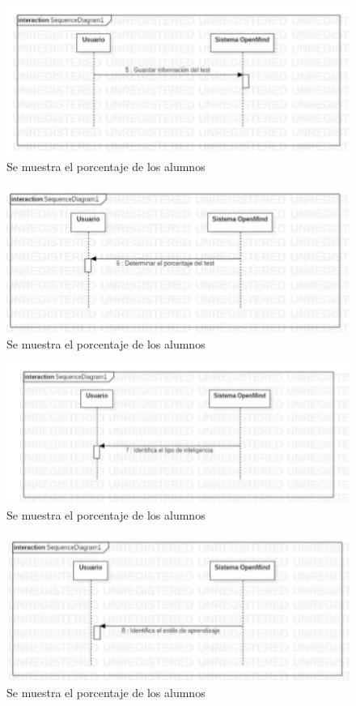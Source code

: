 \documentclass[letterpaper,oneside,openany,11pt]{book}
\begin{document}
\begin{figure}[H]
	\centering
	\includegraphics[width=1.0\textwidth]{./Imagenes/27}
	\caption{Se muestra el porcentaje de los alumnos}
\end{figure}

\begin{figure}[H]
	\centering
	\includegraphics[width=1.0\textwidth]{./Imagenes/28}
	\caption{Se muestra el porcentaje de los alumnos}
\end{figure}

\begin{figure}[H]
	\centering
	\includegraphics[width=1.0\textwidth]{./Imagenes/29}
	\caption{Se muestra el porcentaje de los alumnos}
\end{figure}

\begin{figure}[H]
	\centering
	\includegraphics[width=1.0\textwidth]{./Imagenes/30}
	\caption{Se muestra el porcentaje de los alumnos}
\end{figure}
\end{document}
